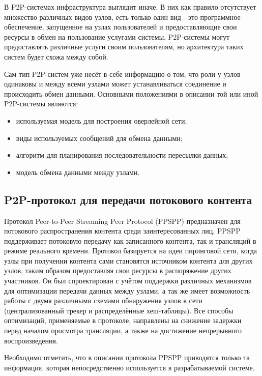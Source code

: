 	В P2P-системах инфраструктура выглядит иначе. В них как правило отсутствует множество различных видов узлов, есть
	только один вид - это программное обеспечение, запущенное на узлах пользователей и предоставляющие свои ресурсы в
	обмен на пользование услугами системы. P2P-системы могут предоставлять различные услуги своим пользователям, но
	архитектура таких систем будет схожа между собой.

	Сам тип P2P-систем уже несёт в себе информацию о том, что роли у узлов одинаковы и между всеми узлами может
	устанавливаться соединение и происходить обмен данными. Основными положениями в описании той или иной P2P-системы
	являются:
	\begin{itemize}
		\item используемая модель для построения оверлейной сети;
		\item виды используемых сообщений для обмена данными;
		\item алгоритм для планирования последовательности пересылки данных;
		\item модель обмена данными между узлами.
	\end{itemize}

	\subsection{P2P-протокол для передачи потокового контента}
	Протокол Peer-to-Peer Streaming Peer Protocol (PPSPP) предназначен для потокового распространения контента среди
	заинтересованных лиц. PPSPP поддерживает потоковую передачу как записанного контента, так и трансляций в режиме
	реального времени. Протокол базируется на идеи пиринговой сети, когда узлы при получении контента сами становятся
	источником контента для других узлов, таким образом предоставляя свои ресурсы в распоряжение других участников. Он
	был спроектирован с учётом поддержки различных механизмов для оптимизации передачи данных между узлами, а так же
	имеет возможность работы с двумя различными схемами обнаружения узлов в сети (централизованный трекер и
	распределённые хеш-таблицы). Все способы оптимизаций, применяемые в протоколе, направлены на снижение задержки перед
	началом просмотра трансляции, а также на достижение непрерывного воспроизведения.

	Необходимо отметить, что в описании протокола PPSPP приводятся только та информация, которая непосредственно
	используется в разрабатываемой системе.

